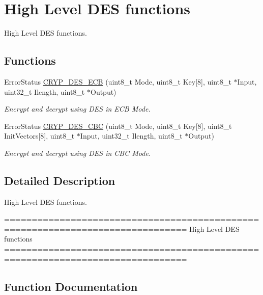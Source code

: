 \hypertarget{group___c_r_y_p___group8}{}\section{High Level D\+E\+S functions}
\label{group___c_r_y_p___group8}


High Level D\+E\+S functions.  


\subsection*{Functions}
\begin{DoxyCompactItemize}
\item 
Error\+Status \hyperlink{group___c_r_y_p___group8_ga3b96b7608b39197209abed5f5845f590}{C\+R\+Y\+P\+\_\+\+D\+E\+S\+\_\+\+E\+C\+B} (uint8\+\_\+t Mode, uint8\+\_\+t Key\mbox{[}8\mbox{]}, uint8\+\_\+t $\ast$Input, uint32\+\_\+t Ilength, uint8\+\_\+t $\ast$Output)
\begin{DoxyCompactList}\small\item\em Encrypt and decrypt using D\+E\+S in E\+C\+B Mode. \end{DoxyCompactList}\item 
Error\+Status \hyperlink{group___c_r_y_p___group8_ga75724391a8560c557e1152b805f5cad1}{C\+R\+Y\+P\+\_\+\+D\+E\+S\+\_\+\+C\+B\+C} (uint8\+\_\+t Mode, uint8\+\_\+t Key\mbox{[}8\mbox{]}, uint8\+\_\+t Init\+Vectors\mbox{[}8\mbox{]}, uint8\+\_\+t $\ast$Input, uint32\+\_\+t Ilength, uint8\+\_\+t $\ast$Output)
\begin{DoxyCompactList}\small\item\em Encrypt and decrypt using D\+E\+S in C\+B\+C Mode. \end{DoxyCompactList}\end{DoxyCompactItemize}


\subsection{Detailed Description}
High Level D\+E\+S functions. 

\begin{DoxyVerb} ===============================================================================
                          High Level DES functions
 ===============================================================================
\end{DoxyVerb}
 

\subsection{Function Documentation}
\hypertarget{group___c_r_y_p___group8_ga75724391a8560c557e1152b805f5cad1}{}
